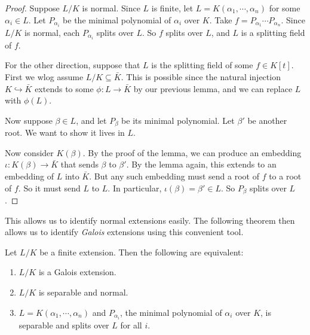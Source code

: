 \documentclass[a4paper]{article}
\begin{document}
\begin{proof}
  Suppose $L/K$ is normal. Since $L$ is finite, let $L = K(\alpha_1, \cdots, \alpha_n)$ for some $\alpha_i \in L$. Let $P_{\alpha_i}$ be the minimal polynomial of $\alpha_i$ over $K$. Take $f = P_{\alpha_1}\cdots P_{\alpha_n}$. Since $L/K$ is normal, each $P_{\alpha_i}$ splits over $L$. So $f$ splits over $L$, and $L$ is a splitting field of $f$.

  For the other direction, suppose that $L$ is the splitting field of some $f \in K[t]$. First we wlog assume $L/K \subseteq \bar K$. This is possible since the natural injection $K\hookrightarrow \bar{K}$ extends to some $\phi:L \to \bar{K}$ by our previous lemma, and we can replace $L$ with $\phi(L)$.

  Now suppose $\beta \in L$, and let $P_\beta$ be its minimal polynomial. Let $\beta'$ be another root. We want to show it lives in $L$.

  Now consider $K(\beta)$. By the proof of the lemma, we can produce an embedding $\iota: K(\beta) \to \bar{K}$ that sends $\beta$ to $\beta'$. By the lemma again, this extends to an embedding of $L$ into $\bar{K}$. But any such embedding must send a root of $f$ to a root of $f$. So it must send $L$ to $L$. In particular, $\iota(\beta) = \beta'\in L$. So $P_\beta$ splits over $L$.
\end{proof}

This allows us to identify normal extensions easily. The following theorem then allows us to identify \emph{Galois} extensions using this convenient tool.

\begin{thm}
  Let $L/K$ be a finite extension. Then the following are equivalent:
  \begin{enumerate}
    \item $L/K$ is a Galois extension.
    \item $L/K$ is separable and normal.
    \item $L = K(\alpha_1, \cdots, \alpha_n)$ and $P_{\alpha_i}$, the minimal polynomial of $\alpha_i$ over $K$, is separable and splits over $L$ for all $i$.
  \end{enumerate}
\end{thm}
\end{document}
